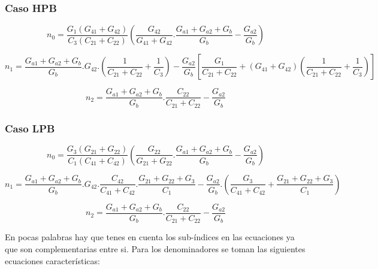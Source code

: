 \subsubsection*{Caso HPB}
\begin{equation}
	n_0= \frac{G_1(G_{41}+G_{42} )}{C_3 ( C_{21} + C_{22} )} \left( \frac{G_{42}}{G_{41}+G_{42}} . \frac{G_{a1}+G_{a2}+G_{b}}{G_b} - \frac{G_{a2}}{G_b} \right)
	\label{coef n0 HPB}
\end{equation}

\begin{equation}
	n_1 = \frac{G_{a1}+G_{a2}+G_b}{G_b} . G_{42}. \left( \frac{1}{C_{21} + C_{22}} + \frac{1}{C_3} \right) - \frac{G_{a2}}{G_b} \left[ \frac{G_1}{C_{21} + C_{22}} + (G_{41}+G_{42}) \left( \frac{1}{C_{21} + C_{22}} + \frac{1}{C_3} \right) \right]
	\label{coef n1 HPB}
\end{equation}

\begin{equation}
	n_2 = \frac{G_{a1}+G_{a2}+G_b}{G_b} . \frac{C_{22}}{C_{21} + C_{22}} - \frac{G_{a2}}{G_b}
	\label{coef n2 HPB}
\end{equation}


\subsubsection*{Caso LPB}

\begin{equation}
	n_0= \frac{G_3(G_{21}+G_{22} )}{C_1 ( C_{41} + C_{42} )} \left( \frac{G_{22}}{G_{21}+G_{22}} . \frac{G_{a1}+G_{a2}+G_{b}}{G_b} - \frac{G_{a2}}{G_b} \right)
	\label{coef n0 LPB}
\end{equation}

\begin{equation}
	n_1 = \frac{G_{a1}+G_{a2}+G_b}{G_b}. G_{42}. \frac{C_{42}}{C_{41}+C_{42}} . \frac{G_{21} + G_{22} + G_3}{C_1} - \frac{G_{a2}}{G_b} . \left( \frac{G_3}{C_{41} + C_{42}} + \frac{G_{21}+G_{22} + G_3}{C_1}\right)
	\label{coef n1 LPB}
\end{equation}

\begin{equation}
	n_2 = \frac{G_{a1}+G_{a2}+G_b}{G_b} . \frac{C_{22}}{C_{21} + C_{22}} - \frac{G_{a2}}{G_b}
	\label{coef n2 LPB}
\end{equation}

En pocas palabras hay que tenes en cuenta los sub-índices en las ecuaciones ya que son complementarias entre si. Para los  denominadores se toman las siguientes ecuaciones características:

